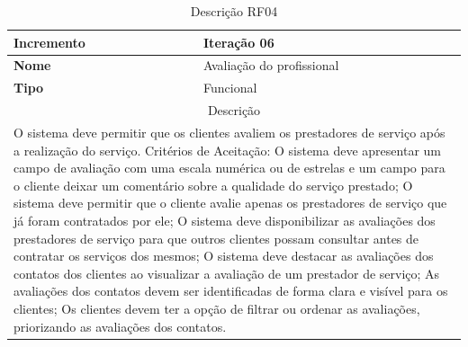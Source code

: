 \begin{table}[htb]
	\centering
	\caption{\label{Formatação do texto.}Descrição RF04}	
	\begin{tabular}{|l|p{11cm}|}
		\hline
		\textbf{Incremento}    & Iteração 06\\ \hline
		\textbf{Nome}    & Avaliação do profissional\\ \hline
		\textbf{Tipo}    & Funcional\\ \hline
		\multicolumn{2}{|c|}{Descrição}\\ \hline
		\multicolumn{2}{|p{12cm}|}{
			O sistema deve permitir que os clientes avaliem os prestadores de serviço após a realização do serviço. \newline
			\newline Critérios de Aceitação: \newline
			O sistema deve apresentar um campo de avaliação com uma escala numérica ou de estrelas e um campo para o cliente deixar um comentário sobre a qualidade do serviço prestado; \newline
			\newline O sistema deve permitir que o cliente avalie apenas os prestadores de serviço que já foram contratados por ele; \newline
			\newline O sistema deve disponibilizar as avaliações dos prestadores de serviço para que outros clientes possam consultar antes de contratar os serviços dos mesmos; \newline
			\newline O sistema deve destacar as avaliações dos contatos dos clientes ao visualizar a avaliação de um prestador de serviço; \newline
			\newline As avaliações dos contatos devem ser identificadas de forma clara e visível para os clientes; \newline
			\newline Os clientes devem ter a opção de filtrar ou ordenar as avaliações, priorizando as avaliações dos contatos. \newline
			} \\ \hline
	\end{tabular}
\end{table}


